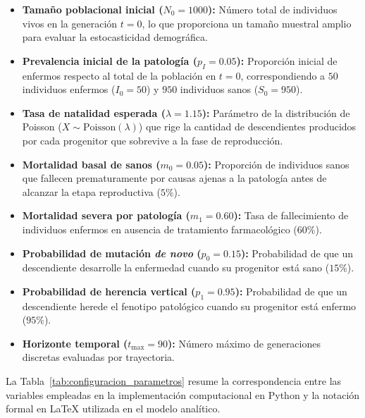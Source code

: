 \documentclass[graybox]{SNmult}
\begin{document}
	\begin{itemize}
		\item \textbf{Tamaño poblacional inicial ($N_0 = 1000$):} Número total de individuos vivos en la generación $t=0$, lo que proporciona un tamaño muestral amplio para evaluar la estocasticidad demográfica.
		\item \textbf{Prevalencia inicial de la patología ($p_I = 0.05$):} Proporción inicial de enfermos respecto al total de la población en $t=0$, correspondiendo a $50$ individuos enfermos ($I_0 = 50$) y $950$ individuos sanos ($S_0 = 950$).
		\item \textbf{Tasa de natalidad esperada ($\lambda = 1.15$):} Parámetro de la distribución de Poisson ($X \sim \text{Poisson}(\lambda)$) que rige la cantidad de descendientes producidos por cada progenitor que sobrevive a la fase de reproducción.
		\item \textbf{Mortalidad basal de sanos ($m_0 = 0.05$):} Proporción de individuos sanos que fallecen prematuramente por causas ajenas a la patología antes de alcanzar la etapa reproductiva ($5\%$).
		\item \textbf{Mortalidad severa por patología ($m_1 = 0.60$):} Tasa de fallecimiento de individuos enfermos en ausencia de tratamiento farmacológico ($60\%$).
		\item \textbf{Probabilidad de mutación \textit{de novo} ($p_0 = 0.15$):} Probabilidad de que un descendiente desarrolle la enfermedad cuando su progenitor está sano ($15\%$).
		\item \textbf{Probabilidad de herencia vertical ($p_1 = 0.95$):} Probabilidad de que un descendiente herede el fenotipo patológico cuando su progenitor está enfermo ($95\%$).
		\item \textbf{Horizonte temporal ($t_{\max} = 90$):} Número máximo de generaciones discretas evaluadas por trayectoria.
	\end{itemize}
	
	
	La Tabla~\ref{tab:configuracion_parametros} resume la correspondencia entre las variables empleadas en la implementación computacional en Python y la notación formal en LaTeX utilizada en el modelo analítico.
	
\end{document}

